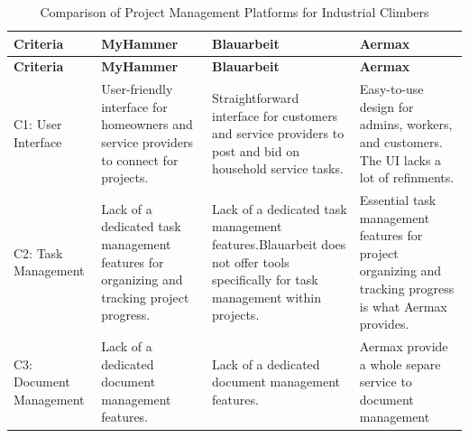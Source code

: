 \begin{longtable}{|p{2cm}|p{3.5cm}|p{3.5cm}|p{3.5cm}|}
    \caption{Comparison of Project Management Platforms for Industrial Climbers} \\
    \hline
    \textbf{Criteria} & \textbf{MyHammer} & \textbf{Blauarbeit} & \textbf{Aermax}  \\
    \hline
    \endfirsthead
    
    \hline
    \textbf{Criteria} & \textbf{MyHammer} & \textbf{Blauarbeit} & \textbf{Aermax}  \\
    \hline
    \endhead
    
    \hline
     
    
    \hline
    \endlastfoot
    
    C1: User Interface &  User-friendly interface for homeowners and service providers to connect for  projects.& Straightforward interface for customers and service providers to post and bid on household service tasks. & Easy-to-use design for admins, workers, and customers. The UI lacks a lot of refinments. \\ 
    \hline
    C2: Task Management & Lack of a dedicated task management features for organizing and tracking project progress. &  Lack of a dedicated task management features.Blauarbeit  does not offer tools specifically for task management within projects. & Essential task management features for project organizing and tracking progress is what Aermax provides. \\
    \hline
    C3: Document Management & Lack of a dedicated document management features. & Lack of a dedicated document management features. & Aermax provide a whole separe service to document management
    \\
    \hline
    

\end{longtable}
